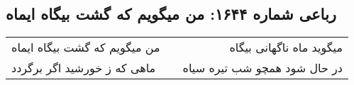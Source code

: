 \begin{center}
\section*{رباعی شماره ۱۶۴۴: من میگویم که گشت بیگاه ایماه}
\label{sec:1644}
\begin{longtable}{l p{0.5cm} r}
من میگویم که گشت بیگاه ایماه
&&
میگوید ماه ناگهانی بیگاه
\\
ماهی که ز خورشید اگر برگردد
&&
در حال شود همچو شب تیره سیاه
\\
\end{longtable}
\end{center}

